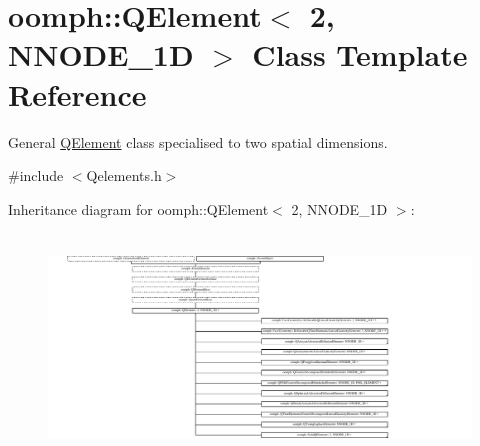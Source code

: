 \hypertarget{classoomph_1_1QElement_3_012_00_01NNODE__1D_01_4}{}\section{oomph\+:\+:Q\+Element$<$ 2, N\+N\+O\+D\+E\+\_\+1D $>$ Class Template Reference}
\label{classoomph_1_1QElement_3_012_00_01NNODE__1D_01_4}


General \hyperlink{classoomph_1_1QElement}{Q\+Element} class specialised to two spatial dimensions.  




{\ttfamily \#include $<$Qelements.\+h$>$}

Inheritance diagram for oomph\+:\+:Q\+Element$<$ 2, N\+N\+O\+D\+E\+\_\+1D $>$\+:\begin{figure}[H]
\begin{center}
\leavevmode
\includegraphics[height=6.021505cm]{classoomph_1_1QElement_3_012_00_01NNODE__1D_01_4}
\end{center}
\end{figure}
